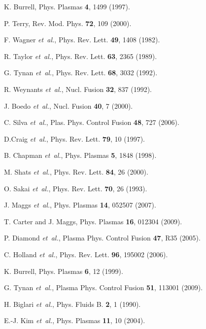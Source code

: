 \documentclass[aps,prl,amsmath,amssymb,reprint,superscriptaddress]{revtex4-1} %
\begin{document}
\providecommand{\noopsort}[1]{}\providecommand{\singleletter}[1]{#1}%
\begin{thebibliography}{10}

K. Burrell, Phys. Plasmas {\bf 4},  1499  (1997).

P. Terry, Rev. Mod. Phys. {\bf 72},  109  (2000).

F. Wagner {\it et~al.}, Phys. Rev. Lett. {\bf 49},  1408  (1982).

R. Taylor {\it et~al.}, Phys. Rev. Lett. {\bf 63},  2365  (1989).

G. Tynan {\it et~al.}, Phys. Rev. Lett. {\bf 68},  3032  (1992).

R. Weynants {\it et~al.}, Nucl. Fusion {\bf 32},  837  (1992).

J. Boedo {\it et~al.}, Nucl. Fusion {\bf 40},  7  (2000).

C. Silva {\it et~al.}, Plas. Phys. Control Fusion {\bf 48},  727  (2006).

D.Craig {\it et~al.}, Phys. Rev. Lett. {\bf 79},  10  (1997).

B. Chapman {\it et~al.}, Phys. Plasmas {\bf 5},  1848  (1998).

M. Shats {\it et~al.}, Phys. Rev. Lett. {\bf 84},  26  (2000).

O. Sakai {\it et~al.}, Phys. Rev. Lett. {\bf 70},  26  (1993).

J. Maggs {\it et~al.}, Phys. Plasmas {\bf 14},  052507  (2007).

T. Carter and J. Maggs, Phys. Plasmas {\bf 16},  012304  (2009).

P. Diamond {\it et~al.}, Plasma Phys. Control Fusion {\bf 47},  R35  (2005).

C. Holland {\it et~al.}, Phys. Rev. Lett. {\bf 96},  195002  (2006).

K. Burrell, Phys. Plasmas {\bf 6},  12  (1999).

G. Tynan {\it et~al.}, Plasma Phys. Control Fusion {\bf 51}, 113001  (2009).

H. Biglari {\it et~al.}, Phys. Fluids B. {\bf 2},  1  (1990).

E.-J. Kim {\it et~al.}, Phys. Plasmas {\bf 11},  10  (2004).


\end{thebibliography}
\end{document}
